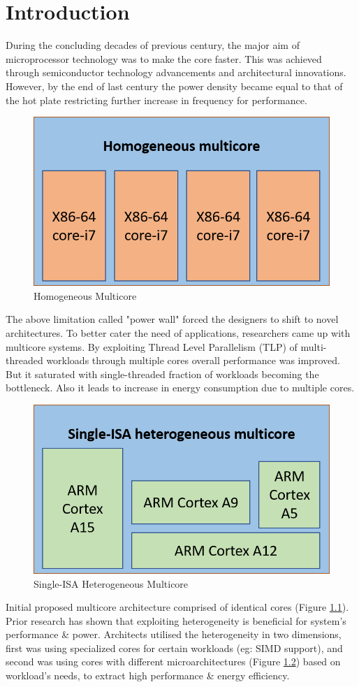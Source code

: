 \documentclass[a4paper,12pt, final]{report}
\begin{document}
\chapter{Introduction}
During the concluding decades of previous century, the major aim of microprocessor technology was to make the core faster. This was achieved through semiconductor technology advancements and architectural innovations. However, by the end of last century the power density became equal to that of the hot plate restricting further increase in frequency for performance.
\begin{figure}[H]
    \centering
    \includegraphics[width=0.5\linewidth]{homogeneous-mc.png}
    \caption{Homogeneous Multicore}
    \label{homo-mc}
\end{figure}
\indent The above limitation called "power wall" forced the designers to shift to novel architectures. To better cater the need of applications, researchers came up with multicore systems. By exploiting Thread Level Parallelism (TLP) of multi-threaded workloads through multiple cores overall performance was improved. But it saturated with single-threaded fraction of workloads becoming the bottleneck\cite{oldamdahl}. Also it leads to increase in energy consumption due to multiple cores. 
\begin{figure}[H]
    \centering
    \includegraphics[width=0.5\linewidth]{single-isa-heterogeneous-mc.png}
    \caption{Single-ISA Heterogeneous Multicore}
    \label{sing-isa-hetero}
\end{figure}
\indent Initial proposed multicore architecture comprised of identical cores (Figure \ref{homo-mc}). Prior research has shown that exploiting heterogeneity is beneficial for system's performance\cite{kumarheteroperf} \& power\cite{kumarheteropower}. Architects utilised the heterogeneity in two dimensions, first was using specialized cores for certain workloads (eg: SIMD support), and second was using cores with different microarchitectures (Figure \ref{sing-isa-hetero}) based on workload's needs, to extract high performance \& energy efficiency.\\\\
\end{document}
